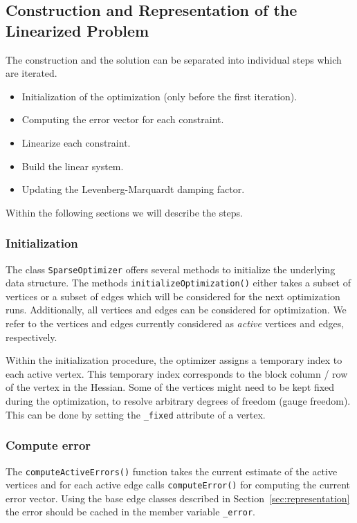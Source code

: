 \documentclass[a4paper]{article}
\begin{document}
\subsection{Construction and Representation of the Linearized Problem}
The construction and the solution can be separated into individual
steps which are iterated.
\begin{itemize}
  \item Initialization of the optimization (only before the first
    iteration).
  \item Computing the error vector for each constraint.
  \item Linearize each constraint.
  \item Build the linear system.
  \item Updating the Levenberg-Marquardt damping factor.
\end{itemize}

Within the following sections we will describe the steps.

\subsubsection{Initialization}
The class \verb+SparseOptimizer+ offers several methods to initialize
the underlying data structure. The methods
\verb+initializeOptimization()+ either takes a subset of vertices or a
subset of edges which will be considered for the next optimization runs.
Additionally, all vertices and edges can be considered for optimization.
We refer to the vertices and edges currently considered as \emph{active}
vertices and edges, respectively.

Within the initialization procedure, the optimizer assigns a temporary
index to each active vertex. This temporary index corresponds to the
block column / row of the vertex in the Hessian. Some of the vertices
might need to be kept fixed during the optimization, to resolve
arbitrary degrees of freedom (gauge freedom). This can be done by
setting the \verb+_fixed+ attribute of a vertex.

\subsubsection{Compute error\label{sec:error}}
The \verb+computeActiveErrors()+ function takes the current estimate of
the active vertices and for each active edge calls
\verb+computeError()+ for computing the current error vector. Using
the base edge classes described in Section~\ref{sec:representation}
the error should be cached in the member variable \verb+_error+.
\end{document}
